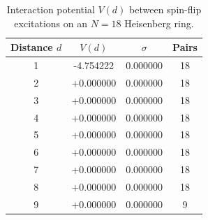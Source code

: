 \begin{table}[h]
\centering
\caption{Interaction potential $V(d)$ between spin-flip excitations on an $N=18$ Heisenberg ring.}
\label{tab:forces}
\begin{tabular}{cccc}
\hline
Distance $d$ & $V(d)$ & $\sigma$ & Pairs \\
\hline
  1 & -4.754222 & 0.000000 & 18 \\
  2 & +0.000000 & 0.000000 & 18 \\
  3 & +0.000000 & 0.000000 & 18 \\
  4 & +0.000000 & 0.000000 & 18 \\
  5 & +0.000000 & 0.000000 & 18 \\
  6 & +0.000000 & 0.000000 & 18 \\
  7 & +0.000000 & 0.000000 & 18 \\
  8 & +0.000000 & 0.000000 & 18 \\
  9 & +0.000000 & 0.000000 & 9 \\
\hline
\end{tabular}
\end{table}